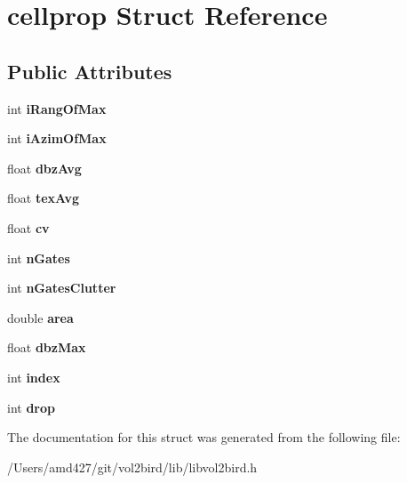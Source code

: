 \hypertarget{structcellprop}{}\section{cellprop Struct Reference}
\label{structcellprop}
\subsection*{Public Attributes}
\begin{DoxyCompactItemize}
\item 
\mbox{\label{structcellprop_a22cf048df4beade4c555f39487513216}} 
int {\bfseries i\+Rang\+Of\+Max}
\item 
\mbox{\label{structcellprop_a6c96d9211d95e9440857875feb3fa7c3}} 
int {\bfseries i\+Azim\+Of\+Max}
\item 
\mbox{\label{structcellprop_a72c9a9e44210d9c4a45efb48733a5413}} 
float {\bfseries dbz\+Avg}
\item 
\mbox{\label{structcellprop_acb8a318ae4dab4cb75be1bd875c3acf0}} 
float {\bfseries tex\+Avg}
\item 
\mbox{\label{structcellprop_acffe2a3106e56eeca28e1df6efc98671}} 
float {\bfseries cv}
\item 
\mbox{\label{structcellprop_abe652d28b8a9e6eccd881c1f4092215e}} 
int {\bfseries n\+Gates}
\item 
\mbox{\label{structcellprop_a01f7c22aef1a2dd1e4171cd7511d7465}} 
int {\bfseries n\+Gates\+Clutter}
\item 
\mbox{\label{structcellprop_a0b867cbf49596672114f5599503673cc}} 
double {\bfseries area}
\item 
\mbox{\label{structcellprop_a9451147dbb6b2fb3d38956fff3aa97da}} 
float {\bfseries dbz\+Max}
\item 
\mbox{\label{structcellprop_a6ab1f148f3014baf318ead5b9dfd039b}} 
int {\bfseries index}
\item 
\mbox{\label{structcellprop_a1276d0a31291cbf999a8ecb601437535}} 
int {\bfseries drop}
\end{DoxyCompactItemize}


The documentation for this struct was generated from the following file\+:\begin{DoxyCompactItemize}
\item 
/\+Users/amd427/git/vol2bird/lib/libvol2bird.\+h\end{DoxyCompactItemize}
